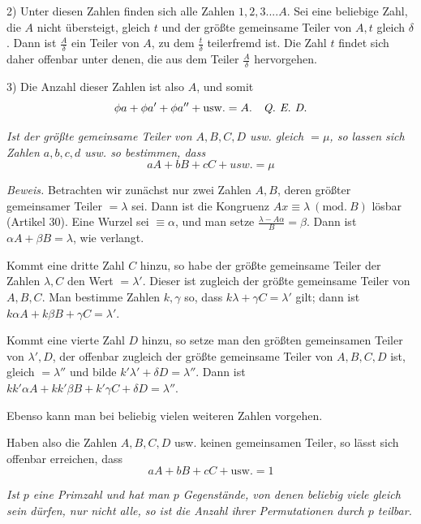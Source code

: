 2) Unter diesen Zahlen finden sich alle Zahlen $1,2,3....A$. Sei eine beliebige Zahl, die $A$ nicht übersteigt, gleich $t$ und der größte gemeinsame Teiler von $A,t$ gleich $\delta$. Dann ist $\frac{A}{\delta}$ ein Teiler von $A$, zu dem $\frac{t}{\delta}$ teilerfremd ist. Die Zahl $t$ findet sich daher offenbar unter denen, die aus dem Teiler $\frac{A}{\delta}$ hervorgehen.

3) Die Anzahl dieser Zahlen ist also $A$, und somit
\[\phi a+\phi a'+\phi a''+\mathrm{usw.}=A.\quad\emph{Q. E. D.}\]

\emph{Ist der größte gemeinsame Teiler von $A,B,C,D$ usw. gleich $=\mu$, so lassen sich Zahlen $a,b,c,d$ usw. so bestimmen, dass}
\[aA+bB+cC+\textit{usw.}=\mu\]

\emph{Beweis.} Betrachten wir zunächst nur zwei Zahlen $A,B$, deren größter gemeinsamer Teiler $=\lambda$ sei. Dann ist die Kongruenz $Ax\equiv\lambda\ (\mathrm{mod.}\ B)$ lösbar (Artikel 30). Eine Wurzel sei $\equiv\alpha$, und man setze $\frac{\lambda-A\alpha}{B}=\beta$. Dann ist $\alpha A+\beta B=\lambda$, wie verlangt.

Kommt eine dritte Zahl $C$ hinzu, so habe der größte gemeinsame Teiler der Zahlen $\lambda,C$ den Wert $=\lambda'$. Dieser ist zugleich der größte gemeinsame Teiler von $A,B,C$. Man bestimme Zahlen $k,\gamma$ so, dass $k\lambda+\gamma C=\lambda'$ gilt; dann ist $k\alpha A+k\beta B+\gamma C=\lambda'$.

Kommt eine vierte Zahl $D$ hinzu, so setze man den größten gemeinsamen Teiler von $\lambda',D$, der offenbar zugleich der größte gemeinsame Teiler von $A,B,C,D$ ist, gleich $=\lambda''$ und bilde $k'\lambda'+\delta D=\lambda''$. Dann ist $kk'\alpha A+kk'\beta B+k'\gamma C+\delta D=\lambda''$.

Ebenso kann man bei beliebig vielen weiteren Zahlen vorgehen.

Haben also die Zahlen $A,B,C,D$ usw. keinen gemeinsamen Teiler, so lässt sich offenbar erreichen, dass
\[aA+bB+cC+\mathrm{usw.}=1\]

\emph{Ist $p$ eine Primzahl und hat man $p$ Gegenstände, von denen beliebig viele gleich sein dürfen, nur nicht alle, so ist die Anzahl ihrer Permutationen durch $p$ teilbar.}

